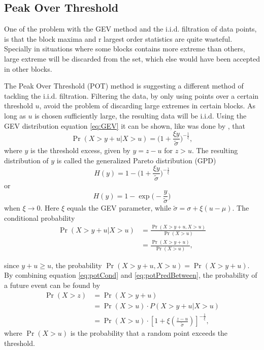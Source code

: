 \subsection{Peak Over Threshold} 
\label{ch:pot}
One of the problem with the GEV method and the i.i.d. filtration of data points, is that the block maxima and r largest order statistics are quite wasteful. Specially in situations where some blocks contains more extreme than others, large extreme will be discarded from the set, which else would have been accepted in other blocks.

The Peak Over Threshold (POT) method is suggesting a different method of tackling the i.i.d. filtration. Filtering the data, by only using points over a certain threshold $u$, avoid the problem of discarding large extremes in certain blocks. As long as $u$ is chosen sufficiently large, the resulting data will be i.i.d. Using the GEV distribution equation \eqref{eq:GEV} it can be shown, like was done by \cite[p.~76]{stuart}, that 
\begin{equation}
\label{eq:potCond}
\Pr(X>y+u|X>u)=\Big(1+\frac{\xi y}{\tilde{\sigma}}\Big)^{-\frac{1}{\xi}},
\end{equation}
where $y$ is the threshold excess, given by $y=z-u$ for $z>u$.
The resulting distribution of $y$ is called the generalized Pareto distribution (GPD)
\begin{equation}
\label{eq:potwxi}
H(y)=1-\Big(1+\frac{\xi y}{\tilde{\sigma}}\Big)^{-\frac{1}{\xi}}
\end{equation}  
or
\begin{equation}
\label{eq:potwoxi}
H(y)=1-\exp\Big(-\frac{y}{\tilde{\sigma}}\Big)
\end{equation}
when $\xi \to 0$. Here $\xi$ equals the GEV parameter, while $\tilde{\sigma}=\sigma+\xi(u-\mu)$.
The conditional probability
\begin{align}
\Pr(X>y+u|X>u)& = \frac{\Pr(X>y+u,X>u)}{\Pr(X>u)} \nonumber\\
&=\frac{\Pr(X>y+u)}{\Pr(X>u)}, \label{eq:potPredBetween} 
\end{align}

since $y+u \geq u$, the probability $\Pr(X>y+u, X>u)=\Pr(X>y+u)$.
By combining equation \eqref{eq:potCond} and \eqref{eq:potPredBetween}, the probability of a future event can be found by
\begin{align}
\Pr(X>z)&=\Pr(X>y+u) \nonumber\\
 		&=\Pr(X>u) \cdot P(X>y+u|X>u)\nonumber\\
 		&=\Pr(X>u) \cdot \left[1+\xi \left( \frac{z-u}{\tilde{\sigma}}\right)\right]^{-\frac{1}{\xi}}, \label{eq:potPred}
\end{align}
where $\Pr(X>u)$ is the probability that a random point exceeds the threshold.

